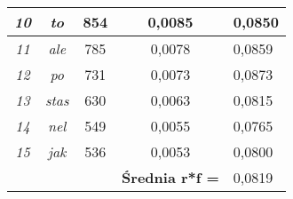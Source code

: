 \documentclass[a4paper]{article}
\begin{document}
\begin{table}
\begin{tabular}{ccc|c|l|}
\multicolumn{1}{|c|}{\textit{10}}                & \multicolumn{1}{c|}{\textit{to}}    & 854                               & 0,0085                                     & 0,0850 \\ \hline
\multicolumn{1}{|c|}{\textit{11}}                & \multicolumn{1}{c|}{\textit{ale}}   & 785                               & 0,0078                                     & 0,0859 \\ \hline
\multicolumn{1}{|c|}{\textit{12}}                & \multicolumn{1}{c|}{\textit{po}}    & 731                               & 0,0073                                     & 0,0873 \\ \hline
\multicolumn{1}{|c|}{\textit{13}}                & \multicolumn{1}{c|}{\textit{stas}}  & 630                               & 0,0063                                     & 0,0815 \\ \hline
\multicolumn{1}{|c|}{\textit{14}}                & \multicolumn{1}{c|}{\textit{nel}}   & 549                               & 0,0055                                     & 0,0765 \\ \hline
\multicolumn{1}{|c|}{\textit{15}}                & \multicolumn{1}{c|}{\textit{jak}}   & 536                               & 0,0053                                     & 0,0800 \\ \hline
\multicolumn{1}{l}{}                             &                                     &                                   & \textbf{Średnia r*f =}                     & 0,0819 \\ \cline{4-5} 
\end{tabular}
\end{table}
\end{document}
